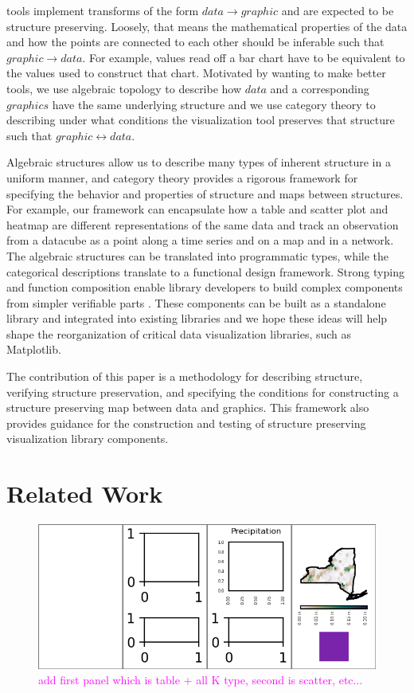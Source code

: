 \documentclass[journal]{IEEEtran}
\newcommand{\note}[1]{\textcolor{magenta}{#1}}
\theoremstyle{definition}
\theoremstyle{remark}
\begin{document}
 tools implement transforms of the form $data \rightarrow graphic$ and are expected to be structure preserving. Loosely, that means the mathematical properties of the data and how the points are connected to each other should be inferable such that  $graphic \rightarrow data$. For example, values read off a bar chart have to be equivalent to the values used to construct that chart. Motivated by wanting to make better tools, we use algebraic topology to describe how $data$ and a corresponding $graphics$ have the same underlying structure and we use category theory to describing under what conditions the visualization tool preserves that structure such that $graphic \leftrightarrow data$. 

Algebraic structures allow us to describe many types of inherent structure in a uniform manner, and category theory provides a rigorous framework for specifying the behavior and properties of structure and maps between structures. For example, our framework can encapsulate how a table and scatter plot and heatmap are different representations of the same data and track an observation from a datacube as a point along a time series and on a map and in a network. The algebraic structures can be translated into programmatic types, while the categorical descriptions translate to a functional design framework. Strong typing and function composition enable library developers to build complex components from simpler verifiable parts \cite{huHowFunctionalProgramming2015, hughesWhyFunctionalProgramming1989}. These  components can be built as a standalone library and integrated into existing libraries and we hope these ideas will help shape the reorganization of critical data visualization libraries, such as Matplotlib. 

The contribution of this paper is a methodology for describing structure, verifying structure preservation, and specifying the conditions for constructing a structure preserving map between data and graphics. This framework also provides guidance for the construction and testing of structure preserving visualization library components.

\section{Related Work}
\label{sec:related-work:continuity}


\begin{figure}[H]
  \includegraphics[width=1\columnwidth]{k_different_types.png}
  \caption{
  \note{add first panel which is table + all K type, second is scatter, etc...}
%
  \label{fig:related-work:continuity:ktypes}}
\end{figure}
\end{document}
